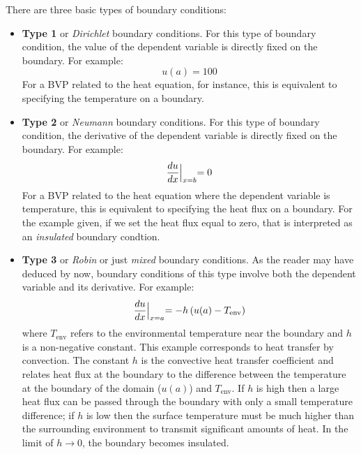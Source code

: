 There are three basic types of boundary conditions:
\begin{itemize}
\item \textbf{Type 1} or \emph{Dirichlet} boundary conditions.  For this type of boundary condition, the value of the dependent variable is directly fixed on the boundary.  For example:
\begin{equation*}
u(a) = 100
\end{equation*}
For a BVP related to the heat equation, for instance, this is equivalent to specifying the temperature on a boundary.
\item \textbf{Type 2} or \emph{Neumann} boundary conditions.  For this type of boundary condition, the derivative of the dependent variable is directly fixed on the boundary.  For example:
\begin{equation*}
\frac{du}{dx}\Bigl|_{x=b} = 0
\end{equation*}
For a BVP related to the heat equation where the dependent variable is temperature, this is equivalent to specifying the heat flux on a boundary.  For the example given, if we set the heat flux equal to zero, that is interpreted as an \emph{insulated} boundary condtion.

\item \textbf{Type 3} or \emph{Robin} or just \emph{mixed} boundary conditions. As the reader may have deduced by now, boundary conditions of this type involve both the dependent variable and its derivative.  For example:
\begin{equation*}
\frac{du}{dx}\Bigl|_{x=a} = -h\left(u(a) - T_{\text{env}}\right)
\end{equation*} 
where $T_{\text{env}}$ refers to the environmental temperature near the boundary and $h$ is a non-negative constant. This example corresponds to heat transfer by convection.  The constant $h$ is the convective heat transfer coefficient and relates heat flux at the boundary to the difference between the temperature at the boundary of the domain ($u(a)$) and $T_{\text{env}}$.  If $h$ is high then a large heat flux can be passed through the boundary with only a small temperature difference; if $h$ is low then the surface temperature must be much higher than the surrounding environment to transmit significant amounts of heat.  In the limit of $h\to 0$, the boundary becomes insulated.

\end{itemize}

